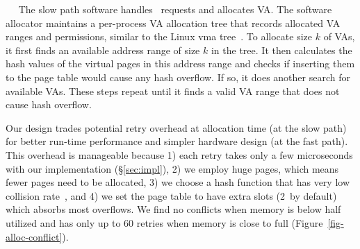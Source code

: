 ~~
The slow path software handles \alloc\ requests and allocates VA.
The software allocator maintains a per-process VA allocation tree that records allocated VA ranges and permissions, similar to the Linux vma tree~\cite{linux-rb-vma}.
To allocate size $k$ of VAs, it first finds an available address range of size $k$ in the tree.
It then calculates the hash values of the virtual pages in this address range
and checks if inserting them to the page table would cause any hash overflow. 
If so, it %
does another search for available VAs.
These steps repeat until it finds a valid VA range that does not cause hash overflow.

Our design trades potential retry overhead at allocation time (at the slow path) for better run-time performance and simpler hardware design (at the fast path).
This overhead is manageable because
1) each retry takes only a few microseconds with our implementation (\S\ref{sec:impl}),
2) we employ huge pages, which means fewer pages need to be allocated, 
3) we choose a hash function that has very low collision rate~\cite{lookup3-wiki},
and 4) we set the page table to have extra slots (2\x\ by default) which absorbs most overflows.
We find no conflicts when memory is below half utilized and has only up to 60 retries when memory is close to full (Figure~\ref{fig-alloc-conflict}).

